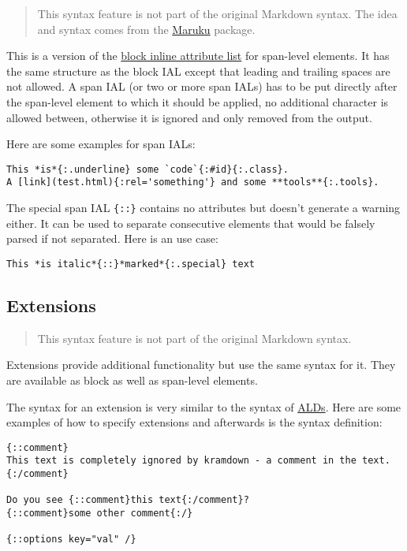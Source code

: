 \documentclass[a4paper]{article}
\begin{document}
\begin{quote}
This syntax feature is not part of the original Markdown syntax. The
idea and syntax comes from the
\href{http://maruku.rubyforge.org}{Maruku} package.
\end{quote}

This is a version of the \protect\hyperlink{block-ials}{block inline
attribute list} for span-level elements. It has the same structure as
the block IAL except that leading and trailing spaces are not allowed. A
span IAL (or two or more span IALs) has to be put directly after the
span-level element to which it should be applied, no additional
character is allowed between, otherwise it is ignored and only removed
from the output.

Here are some examples for span IALs:

\begin{verbatim}
This *is*{:.underline} some `code`{:#id}{:.class}.
A [link](test.html){:rel='something'} and some **tools**{:.tools}.
\end{verbatim}

The special span IAL \texttt{\{::\}} contains no attributes but doesn't
generate a warning either. It can be used to separate consecutive
elements that would be falsely parsed if not separated. Here is an use
case:

\begin{verbatim}
This *is italic*{::}*marked*{:.special} text
\end{verbatim}

\hypertarget{extensions}{\subsection{Extensions}\label{extensions}}

\begin{quote}
This syntax feature is not part of the original Markdown syntax.
\end{quote}

Extensions provide additional functionality but use the same syntax for
it. They are available as block as well as span-level elements.

The syntax for an extension is very similar to the syntax of
\protect\hyperlink{attribute-list-definitions}{ALDs}. Here are some
examples of how to specify extensions and afterwards is the syntax
definition:

\begin{verbatim}
{::comment}
This text is completely ignored by kramdown - a comment in the text.
{:/comment}

Do you see {::comment}this text{:/comment}?
{::comment}some other comment{:/}

{::options key="val" /}
\end{verbatim}
\end{document}
